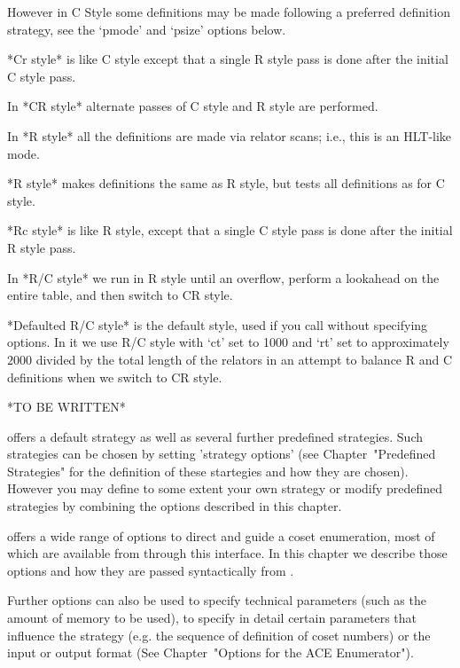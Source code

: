 However in C Style some  definitions may be made following a preferred
definition strategy, see the `pmode' and `psize' options below.

*Cr style* is like  C style except that a single R  style pass is done
after the initial C style pass.

In *CR style* alternate passes of C style and R style are performed.


In *R  style* all  the definitions are  made via relator  scans; i.e.,
this is an HLT-like mode.

*R\*  style* makes  definitions the  same as  R style,  but  tests all
definitions as for C style.

*Rc style* is like R style, except  that a single C style pass is done
after the initial R style pass.

In  *R/C  style* we  run  in  R style  until  an  overflow, perform  a
lookahead on the entire table, and then switch to CR style.

*Defaulted R/C  style* is the default  style, used if  you call {\ACE}
without specifying  options. In it we  use R/C style with  `ct' set to
1000 and `rt' set to  approximately $2000$ divided by the total length
of the relators  in an attempt to balance R and  C definitions when we
switch to CR style.


*TO BE WRITTEN*



{\ACE} offers a default strategy as well as several further predefined
strategies.   Such  strategies  can  be chosen  by  setting  'strategy
options'  (see Chapter~"Predefined Strategies"  for the  definition of
these startegies and  how they are chosen). However  you may define to
some  extent your  own  strategy or  modify  predefined strategies  by
combining the options described in this chapter.

{\ACE} offers  a wide  range of  options to direct  and guide  a coset
enumeration,  most of  which are  available from  {\GAP}  through this
interface.  In this chapter we describe those options and how they are
passed syntactically from {\GAP}.

Further options can also be used to specify technical parameters (such
as the  amount of  memory to  be used), to  specify in  detail certain
parameters  that  influence  the   strategy  (e.g.   the  sequence  of
definition  of coset  numbers)  or  the input  or  output format  (See
Chapter~"Options for the ACE Enumerator").

